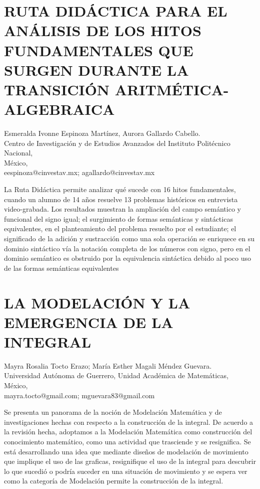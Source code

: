 \section{RUTA DIDÁCTICA PARA EL ANÁLISIS DE LOS HITOS FUNDAMENTALES QUE SURGEN
DURANTE LA TRANSICIÓN ARITMÉTICA-ALGEBRAICA}

\begin{datos}
Esmeralda Ivonne Espinoza Martínez, Aurora Gallardo Cabello. \\
Centro de Investigación y de Estudios Avanzados del Instituto Politécnico Nacional,\\
\hfill México, \\
 \hfill eespinoza@cinvestav.mx; agallardo@cinvestav.mx 
\end{datos}

La Ruta Didáctica permite analizar qué sucede con 16 hitos fundamentales,
cuando un alumno de 14 años resuelve 13 problemas históricos en entrevista
video-grabada. Los resultados muestran la ampliación del campo semántico
y funcional del signo igual; el surgimiento de formas semánticas y
sintácticas equivalentes, en el planteamiento del problema resuelto
por el estudiante; el significado de la adición y sustracción como
una sola operación se enriquece en su dominio sintáctico vía la notación
completa de los números con signo, pero en el dominio semántico es
obstruido por la equivalencia sintáctica debido al poco uso de las
formas semánticas equivalentes


\section{LA MODELACIÓN Y LA EMERGENCIA DE LA INTEGRAL}

\begin{datos}
Mayra Rosalia Tocto Erazo; María Esther Magali Méndez Guevara. \\
Universidad Autónoma de Guerrero, Unidad Académica de Matemáticas,\\
\hfill México, \\
 \hfill mayra.tocto@gmail.com; mguevara83@gmail.com  
\end{datos}

Se presenta un panorama de la noción de Modelación Matemática y de
investigaciones hechas con respecto a la construcción de la integral.
De acuerdo a la revisión hecha, adoptamos a la Modelación Matemática
como construcción del conocimiento matemático, como una actividad
que trasciende y se resignifica. Se está desarrollando una idea que
mediante diseños de modelación de movimiento que implique el uso de
las graficas, resignifique el uso de la integral para descubrir lo
que sucedió o podría suceder en una situación de movimiento y se espera
ver como la categoría de Modelación permite la construcción de la
integral.


